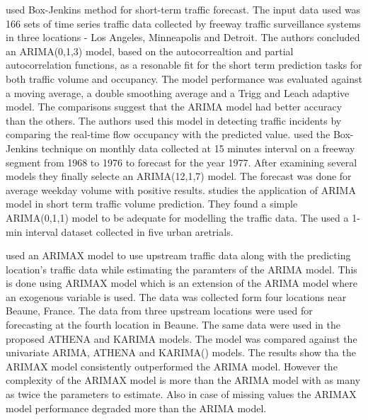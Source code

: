 \citet{ahmed1979analysis} used Box-Jenkins method for short-term traffic forecast. The input data
used was 166 sets of time series traffic data collected by freeway traffic surveillance systems in
three locations - Los Angeles, Minneapolis and Detroit. The authors concluded an ARIMA(0,1,3)
model, based on the autocorrealtion and partial autocorrelation functions, as a resonable fit for
the short term prediction tasks for both traffic volume and occupancy. The model performance was
evaluated against a moving average, a double smoothing average and a Trigg and Leach adaptive
model. The comparisons suggest that the ARIMA model had better accuracy than the others. The
authors used this model in detecting traffic incidents by comparing the real-time flow occupancy
with the predicted value. \citet{nihan1980use} used the Box-Jenkins technique on monthly data
collected at 15 minutes interval on a freeway segment from 1968 to 1976 to forecast for the year
1977. After examining several models they finally selecte an ARIMA(12,1,7) model. The forecast
was done for average weekday volume with positive results. \citet{hamed1995short} studies the
application of ARIMA model in short term traffic volume prediction. They found a simple ARIMA(0,1,1)
model to be adequate for modelling the traffic data. The used a 1-min interval dataset collected in
five urban aretrials.

\citet{williams2001multivariate} used an ARIMAX model to use upstream traffic data along with the
predicting location's traffic data while estimating the paramters of the ARIMA model. This is
done using ARIMAX model which is an extension of the ARIMA model where an exogenous variable is
used. The data was collected form four locations near Beaune, France. The data from three upstream
locations were used for forecasting at the fourth location in Beaune. The same data were used
in the proposed ATHENA and KARIMA models. The model was compared  against the univariate ARIMA,
ATHENA\citet{danech1991athena} and KARIMA(\citet{van1996combining}) models. The results show tha
the ARIMAX model consistently outperformed the ARIMA model. However the complexity of the ARIMAX
model is more than the ARIMA model with as many as twice the parameters to estimate. Also in case
of missing values the ARIMAX model performance degraded more than the ARIMA model.

